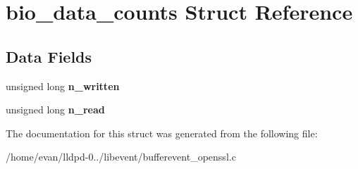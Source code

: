 \section{bio\-\_\-data\-\_\-counts \-Struct \-Reference}
\label{structbio__data__counts}
\subsection*{\-Data \-Fields}
\begin{DoxyCompactItemize}
\item 
unsigned long {\bfseries n\-\_\-written}\label{structbio__data__counts_a2b8441799e68d20cd6990dfdd9d24038}

\item 
unsigned long {\bfseries n\-\_\-read}\label{structbio__data__counts_aa66082cc762cb322569c78d267d5e154}

\end{DoxyCompactItemize}


\-The documentation for this struct was generated from the following file\-:\begin{DoxyCompactItemize}
\item 
/home/evan/lldpd-\/0../libevent/bufferevent\-\_\-openssl.\-c\end{DoxyCompactItemize}
